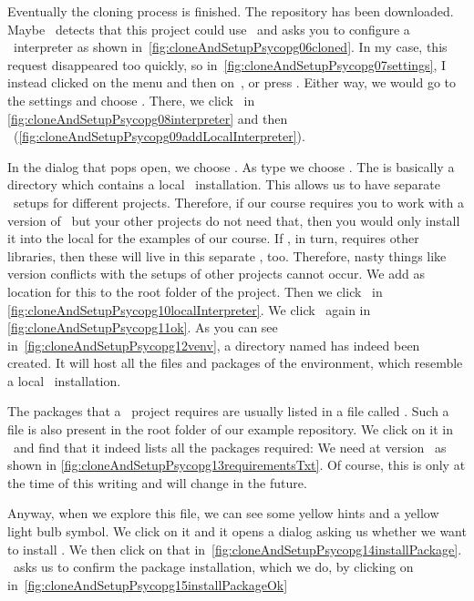 Eventually the cloning process is finished.
The repository has been downloaded.
Maybe \pycharm\ detects that this project could use \python\ and asks you to configure a \python\ interpreter as shown in~\cref{fig:cloneAndSetupPsycopg06cloned}.
In my case, this request disappeared too quickly, so in~\cref{fig:cloneAndSetupPsycopg07settings}, I instead clicked on the  menu and then on~, or press .
Either way, we would go to the  settings and choose .
There, we click~ in \cref{fig:cloneAndSetupPsycopg08interpreter} and then ~(\cref{fig:cloneAndSetupPsycopg09addLocalInterpreter}).

In the dialog that pops open, we choose .
As type we choose .
The  is basically a directory which contains a local \python\ installation.
This allows us to have separate \python\ setups for different projects.
Therefore, if our course requires you to work with a version of \psycopg\ but your other projects do not need that, then you would only install it into the local  for the examples of our course.
If \psycopg, in turn, requires other libraries, then these will live in this separate , too.
Therefore, nasty things like version conflicts with the setups of other projects cannot occur.
We add  as location for this  to the root folder of the project.
Then we click~ in \cref{fig:cloneAndSetupPsycopg10localInterpreter}.
We click~ again in \cref{fig:cloneAndSetupPsycopg11ok}.
As you can see in~\cref{fig:cloneAndSetupPsycopg12venv}, a directory named  has indeed been created.
It will host all the files and packages of the environment, which resemble a local \python\ installation.

The packages that a \python\ project requires are usually listed in a file called .
Such a file is also present in the root folder of our example repository.
We click on it in \pycharm\ and find that it indeed lists all the packages required:
We need  at version~ as shown in \cref{fig:cloneAndSetupPsycopg13requirementsTxt}.
Of course, this is only at the time of this writing and will change in the future.

Anyway, when we explore this file, we can see some yellow hints and a yellow light bulb symbol.
We click on it and it opens a dialog asking us whether we want to install \psycopg.
We then click on that in~\cref{fig:cloneAndSetupPsycopg14installPackage}.
\pycharm\ asks us to confirm the package installation, which we do, by clicking on~ in~\cref{fig:cloneAndSetupPsycopg15installPackageOk}

